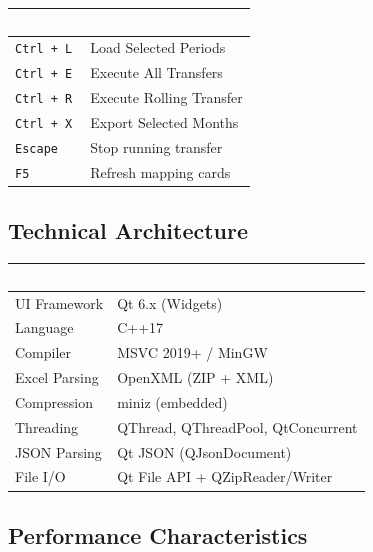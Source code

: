 \documentclass[11pt,a4paper]{article}
\begin{document}
\begin{center}
\begin{tabularx}{0.88\linewidth}{@{} l X @{}}
\toprule
\rowcolor{PrimaryBlue}
\textcolor{White}{\textbf{Shortcut}} & \textcolor{White}{\textbf{Action}} \\
\midrule
\texttt{Ctrl + L} & Load Selected Periods \\
\texttt{Ctrl + E} & Execute All Transfers \\
\texttt{Ctrl + R} & Execute Rolling Transfer \\
\texttt{Ctrl + X} & Export Selected Months \\
\texttt{Escape}   & Stop running transfer \\
\texttt{F5}       & Refresh mapping cards \\
\bottomrule
\end{tabularx}
\end{center}

\subsection{Technical Architecture}

\begin{center}
\begin{tabularx}{0.88\linewidth}{@{} l X @{}}
\toprule
\rowcolor{PrimaryBlue}
\textcolor{White}{\textbf{Component}} & \textcolor{White}{\textbf{Technology}} \\
\midrule
UI Framework      & Qt 6.x (Widgets) \\
Language          & C++17 \\
Compiler          & MSVC 2019+ / MinGW \\
Excel Parsing     & OpenXML (ZIP + XML) \\
Compression       & miniz (embedded) \\
Threading         & QThread, QThreadPool, QtConcurrent \\
JSON Parsing      & Qt JSON (QJsonDocument) \\
File I/O          & Qt File API + QZipReader/Writer \\
\bottomrule
\end{tabularx}
\end{center}

\subsection{Performance Characteristics}
\end{document}
